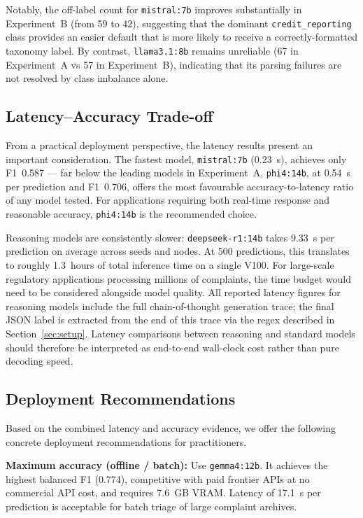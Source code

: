 \documentclass[a4paper,fleqn]{cas-dc}
\begin{document}
Notably, the off-label count for \texttt{mistral:7b} improves
substantially in Experiment~B (from 59 to 42), suggesting that the
dominant \texttt{credit\_reporting} class provides an easier default
that is more likely to receive a correctly-formatted taxonomy label.
By contrast, \texttt{llama3.1:8b} remains unreliable
(67 in Experiment~A vs 57 in Experiment~B), indicating that its
parsing failures are not resolved by class imbalance alone.

\subsection{Latency--Accuracy Trade-off}

From a practical deployment perspective, the latency results present
an important consideration. The fastest model, \texttt{mistral:7b}
(0.23~s), achieves only F1~0.587 --- far below the leading models in
Experiment~A.
\texttt{phi4:14b}, at 0.54~s per prediction and F1~0.706, offers
the most favourable accuracy-to-latency ratio of any model tested.
For applications requiring both real-time response and reasonable
accuracy, \texttt{phi4:14b} is the recommended choice.

Reasoning models are consistently slower: \texttt{deepseek-r1:14b}
takes 9.33~s per prediction on average across seeds and nodes.
At 500 predictions, this translates to roughly 1.3~hours of total
inference time on a single V100. For
large-scale regulatory applications processing millions of complaints,
the time budget would need to be considered alongside model quality.
All reported latency figures for reasoning models include the full
chain-of-thought generation trace; the final JSON label is extracted
from the end of this trace via the regex described in
Section~\ref{sec:setup}. Latency comparisons between reasoning and
standard models should therefore be interpreted as end-to-end
wall-clock cost rather than pure decoding speed.

\subsection{Deployment Recommendations}

Based on the combined latency and accuracy evidence, we offer the
following concrete deployment recommendations for practitioners.

\textbf{Maximum accuracy (offline / batch):}
Use \texttt{gemma4:12b}. It achieves the highest balanced F1 (0.774),
competitive with paid frontier APIs at no commercial API cost, and requires 7.6~GB VRAM.
Latency of 17.1~s per prediction is acceptable for batch triage of
large complaint archives.
\end{document}
